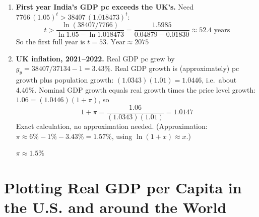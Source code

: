 \documentclass[11pt]{article}
\newcommand{\ans}[1]{$\boxed{#1}$}
\begin{document}
\begin{enumerate}[label=\textbf{\arabic*.}, leftmargin=*]
\item \textbf{First year India's GDP pc exceeds the UK's.}
Need $7766\,(1.05)^t > 38407\,(1.018473)^t$:
\[
  t > \frac{\ln(38407/7766)}{\ln 1.05 - \ln 1.018473}
    = \frac{1.5985}{0.04879 - 0.01830} \approx 52.4 \text{ years}
\]
So the first full year is $t=53$.
\ans{\text{Year} \approx 2075}

\item \textbf{UK inflation, 2021--2022.}
Real GDP pc grew by $g_{y} = 38407/37134 - 1 = 3.43\%$. Real GDP growth is (approximately) pc growth plus population growth: $(1.0343)(1.01) = 1.0446$, i.e.\ about 4.46\%. Nominal GDP growth equals real growth times the price level growth: $1.06 = (1.0446)(1+\pi)$, so
\[
  1+\pi = \frac{1.06}{(1.0343)(1.01)} = 1.0147
\]
Exact calculation, no approximation needed. (Approximation: $\pi \approx 6\% - 1\% - 3.43\% = 1.57\%$, using $\ln(1+x)\approx x$.)

\ans{\pi \approx 1.5\%}

\end{enumerate}

\section{Plotting Real GDP per Capita in the U.S. and around the World}
\end{document}
